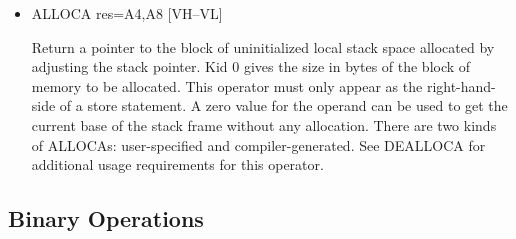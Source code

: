 \documentclass{article}
\begin{document}
\begin{itemize}
\item
{}%
ALLOCA res=A4,A8 \hfill [VH--VL]

Return a pointer to the block of uninitialized local stack space
allocated by adjusting the stack pointer. Kid 0 gives the size in
bytes of the block of
memory to be allocated. This operator must only appear as the
right-hand-side of a store statement. A zero value for the operand
can be used to get the current base of the stack frame without any
allocation. There are two kinds of
%
ALLOCAs: user-specified and compiler-generated. See
%
DEALLOCA for
additional usage requirements for this operator.

\end{itemize}
\subsection{Binary Operations}
\end{document}
